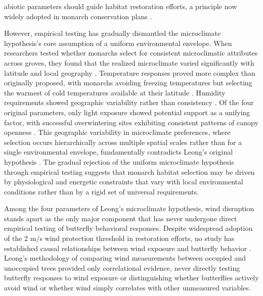 abiotic parameters should guide habitat restoration efforts, a principle now widely adopted in monarch conservation plans \parencite{xercessocietyStateMonarchOverwintering2016,jepsenProtectingCaliforniasButterfly2017,peltonMonarchButterflyOverwintering2020,weissRecommendationsRestorationMonarch2008,althouse&meadeinc.EllwoodMesaSperling2023}.

However, empirical testing has gradually dismantled the microclimate hypothesis's core assumption of a uniform environmental envelope. When researchers tested whether monarchs select for consistent microclimatic attributes across groves, they found that the realized microclimate varied significantly with latitude and local geography \parencite{sanieeHierarchyScaleInfluence2022}. Temperature responses proved more complex than originally proposed, with monarchs avoiding freezing temperatures but selecting the warmest of cold temperatures available at their latitude \parencite{fisherClimaticNicheModel2018}. Humidity requirements showed geographic variability rather than consistency \parencite{sanieeHierarchyScaleInfluence2022}. Of the four original parameters, only light exposure showed potential support as a unifying factor, with successful overwintering sites exhibiting consistent patterns of canopy openness \parencite{sanieeHierarchyScaleInfluence2022,weissForestCanopyStructure1991}. This geographic variability in microclimate preferences, where selection occurs hierarchically across multiple spatial scales rather than for a single environmental envelope, fundamentally contradicts Leong's original hypothesis \parencite{fisherClimaticNicheModel2018,sanieeHierarchyScaleInfluence2022}. The gradual rejection of the uniform microclimate hypothesis through empirical testing suggests that monarch habitat selection may be driven by physiological and energetic constraints that vary with local environmental conditions rather than by a rigid set of universal requirements.

Among the four parameters of Leong's microclimate hypothesis, wind disruption stands apart as the only major component that has never undergone direct empirical testing of butterfly behavioral responses. Despite widespread adoption of the 2 m/s wind protection threshold in restoration efforts, no study has established causal relationships between wind exposure and butterfly behavior \parencite{xercessocietyManagingMonarchsWest2018,jepsenProtectingCaliforniasButterfly2017,althouse&meadeinc.EllwoodMesaSperling2023,u.s.fishandwildlifeserviceMonarchDanausPlexippus2024,weissAlbanyHillMonarch2018,leongEvaluationManagementCalifornia2016}. Leong's methodology of comparing wind measurements between occupied and unoccupied trees provided only correlational evidence, never directly testing butterfly responses to wind exposure or distinguishing whether butterflies actively avoid wind or whether wind simply correlates with other unmeasured variables.

